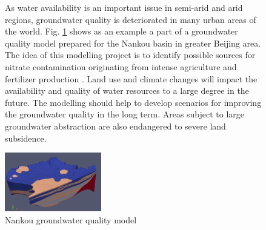 \begin{figure}[!htb]
\begin{minipage}[t]{0.48\textwidth}
As water availability is an important issue in semi-arid and arid regions, groundwater quality is deteriorated in many urban areas of the world.
Fig. \ref{fig:apl5} shows as an example a part of a groundwater quality model prepared for the Nankou basin in greater Beijing area.
The idea of this modelling project is to identify possible sources for nitrate contamination originating from intense agriculture and fertilizer production \cite{SunEtAl2010}. Land use and climate changes will impact the availability and quality of water resources to a large degree in the future. The modelling should help to develop scenarios for improving the groundwater quality in the long term. Areas subject to large groundwater abstraction are also endangered to severe land subsidence.
\end{minipage}
\hspace{0.02\textwidth}
\begin{minipage}[t]{0.48\textwidth}
\vspace{2cm}
\includegraphics[scale=1]{figures/intro4}
\caption{Nankou groundwater quality model \cite{SunEtAl2010}}
\label{fig:apl5}
\end{minipage}
\end{figure}


